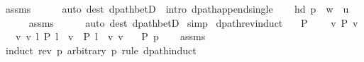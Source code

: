 \begin{isabellebody}
\ assms\isanewline
\ \ \ \ \isamarkupfalse%
\ {\isacharparenleft}{\kern0pt}auto\ dest{\isacharcolon}{\kern0pt}\ dpath{\isacharunderscore}{\kern0pt}betD{\isacharparenleft}{\kern0pt}{}{\isacharcomma}{\kern0pt}\ {}{\isacharparenright}{\kern0pt}\ intro{\isacharcolon}{\kern0pt}\ dpath{\isacharunderscore}{\kern0pt}append{\isacharunderscore}{\kern0pt}single{\isacharparenright}{\kern0pt}\isanewline
\ \ \isamarkupfalse%
\ {\isachardoublequoteopen}hd\ {\isacharparenleft}{\kern0pt}p\ {\isacharat}{\kern0pt}\ {\isacharbrackleft}{\kern0pt}w{\isacharbrackright}{\kern0pt}{\isacharparenright}{\kern0pt}\ {\isacharequal}{\kern0pt}\ u{\isachardoublequoteclose}\isanewline
\ \ \ \ \isamarkupfalse%
\ assms{\isacharparenleft}{\kern0pt}{}{\isacharparenright}{\kern0pt}\isanewline
\ \ \ \ \isamarkupfalse%
\ {\isacharparenleft}{\kern0pt}auto\ dest{\isacharcolon}{\kern0pt}\ dpath{\isacharunderscore}{\kern0pt}betD{\isacharparenleft}{\kern0pt}{}{\isacharparenright}{\kern0pt}{\isacharparenright}{\kern0pt}\isanewline
{}\isamarkupfalse%
\ simp{\isacharplus}{\kern0pt}%
\endisatagproof
{\isafoldproof}%
%
\isadelimproof
\isanewline
%
\endisadelimproof
\isanewline
{}\isamarkupfalse%
\ dpath{\isacharunderscore}{\kern0pt}rev{\isacharunderscore}{\kern0pt}induct{\isacharcolon}{\kern0pt}\isanewline
\ \ \ {\isachardoublequoteopen}P\ {\isacharbrackleft}{\kern0pt}{\isacharbrackright}{\kern0pt}{\isachardoublequoteclose}\isanewline
\ \ \ {\isachardoublequoteopen}{\isasymAnd}v{\isachardot}{\kern0pt}\ P\ {\isacharbrackleft}{\kern0pt}v{\isacharbrackright}{\kern0pt}{\isachardoublequoteclose}\isanewline
\ \ \ {\isachardoublequoteopen}{\isasymAnd}v\ v{\isacharprime}{\kern0pt}\ l{\isachardot}{\kern0pt}\ P\ {\isacharparenleft}{\kern0pt}l\ {\isacharat}{\kern0pt}\ {\isacharbrackleft}{\kern0pt}v{\isacharbrackright}{\kern0pt}{\isacharparenright}{\kern0pt}\ {\isasymLongrightarrow}\ P\ {\isacharparenleft}{\kern0pt}l\ {\isacharat}{\kern0pt}\ {\isacharbrackleft}{\kern0pt}v{\isacharcomma}{\kern0pt}\ v{\isacharprime}{\kern0pt}{\isacharbrackright}{\kern0pt}{\isacharparenright}{\kern0pt}{\isachardoublequoteclose}\isanewline
\ \ \ {\isachardoublequoteopen}P\ p{\isachardoublequoteclose}\isanewline
%
\isadelimproof
\ \ %
\endisadelimproof
%
\isatagproof
{}\isamarkupfalse%
\ assms\isanewline
{}\isamarkupfalse%
\ {\isacharparenleft}{\kern0pt}induct\ {\isachardoublequoteopen}rev\ p{\isachardoublequoteclose}\ arbitrary{\isacharcolon}{\kern0pt}\ p\ rule{\isacharcolon}{\kern0pt}\ dpath{\isacharunderscore}{\kern0pt}induct{\isacharparenright}{\kern0pt}\isanewline

\end{isabellebody}

